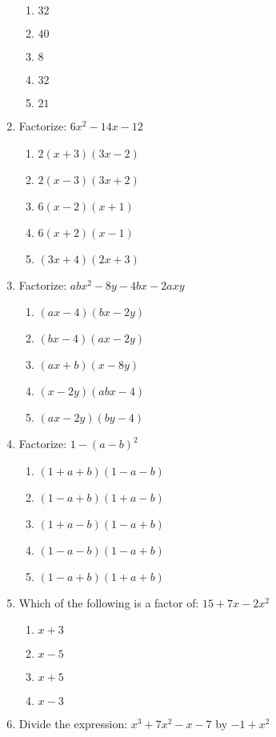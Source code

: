 \begin{multicols}{2}
\begin{enumerate}[label={\arabic*.}]
	\begin{enumerate}[label={\Alph*.}]
	\item \(32\)
	\item \(40\)
	\item \(8\)
	\item \(32\)
	\item \(21\)
	\end{enumerate}
\item Factorize: $6x^2 -14x - 12$
	\begin{enumerate}[label={\Alph*.}]
	\item \(2(x+3)(3x-2)\)
	\item \(2(x-3)(3x +2)\)
	\item \(6(x-2)(x+1)\)
	\item \(6(x+2)(x-1)\)
	\item \((3x+4)(2x+3)\)
	\end{enumerate}
\item Factorize: $abx^2 - 8y -4bx - 2axy$
	\begin{enumerate}[label={\Alph*.}]
	\item \((ax -4)(bx-2y)\)
	\item \((bx-4)(ax-2y)\)
	\item \((ax+b)(x-8y)\)
	\item \((x-2y)(abx-4)\)
	\item \((ax-2y)(by-4)\)
	\end{enumerate}
\item Factorize: $ 1- (a-b)^2$
	\begin{enumerate}[label={\Alph*.}]
	\item \((1 +a+b)(1-a-b)\)
	\item \((1-a + b)(1+ a -b)\)
	\item \((1 + a - b)(1-a+b)\)
	\item \((1 -a -b)(1-a + b)\)
	\item \((1 -a +b)(1+a + b)\)
	\end{enumerate}
\item Which of the following is a factor of: $15 + 7x -2x^2$
	\begin{enumerate}[label={\Alph*.}]
	\item \(x +3\)
	\item \(x-5\)
	\item \(x+5\)
	\item \(x-3\)
	\end{enumerate}
\item Divide the expression: $x^3 + 7x^2 -x -7$ by $-1 + x^2$
	\begin{enumerate}[label={\Alph*.}]

\end{enumerate}
\end{enumerate}
\end{multicols}
